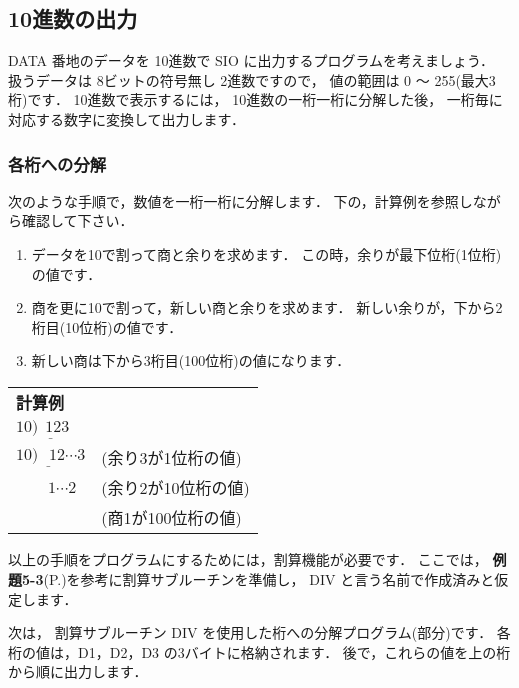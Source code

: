\subsection{10進数の出力}

DATA 番地のデータを 10進数で SIO に出力するプログラムを考えましょう．
扱うデータは 8ビットの符号無し 2進数ですので，
値の範囲は 0 〜 255(最大3桁)です．
10進数で表示するには， 
10進数の一桁一桁に分解した後，
一桁毎に対応する数字に変換して出力します．

\subsubsection{各桁への分解}
次のような手順で，数値を一桁一桁に分解します．
下の，計算例を参照しながら確認して下さい．
\begin{enumerate}
\item データを10で割って商と余りを求めます．
この時，余りが最下位桁(1位桁)の値です．

\item 商を更に10で割って，新しい商と余りを求めます．
新しい余りが，下から2桁目(10位桁)の値です．

\item 新しい商は下から3桁目(100位桁)の値になります．
\end{enumerate}

\begin{tabular}{l l}
{\bf 計算例} & \\
$10 \underline{) ~~123 } $ & \\
$10 \underline{) ~~~12 } {\cdots 3}$ & (余り3が1位桁の値)\\
$~~  ~~~~~~~1 {\cdots 2}$            & (余り2が10位桁の値) \\
                                     & (商1が100位桁の値)
\end{tabular}
\vspace{0.5cm}

以上の手順をプログラムにするためには，割算機能が必要です．
ここでは，
{\bf 例題5-3}(P.\pageref{rei:5_3})を参考に割算サブルーチンを準備し，
DIV と言う名前で作成済みと仮定します．

次は，
割算サブルーチン DIV を使用した桁への分解プログラム(部分)です．
各桁の値は，D1，D2，D3 の3バイトに格納されます．
後で，これらの値を上の桁から順に出力します．

